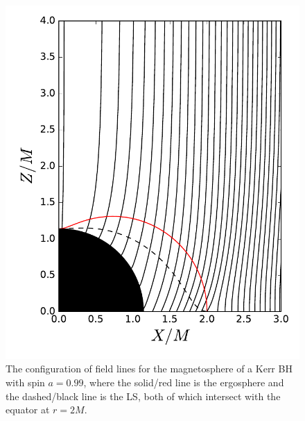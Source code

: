 \documentclass[aps,prd,reprint,nofootinbib, superscriptaddress]{revtex4-1}
\begin{document}
\begin{figure}
\includegraphics[scale=0.6]{f1}
\caption{\label{fig:field_lines} The configuration of field lines for the magnetosphere of a Kerr BH with spin $a=0.99$,
where the solid/red line is the ergosphere and the dashed/black line is the LS, both of which intersect with
the equator at $r=2 M$. }
\end{figure}
\end{document}
